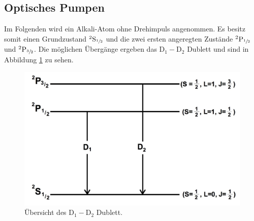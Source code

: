 \subsection{Optisches Pumpen}
Im Folgenden wird ein Alkali-Atom ohne Drehimpuls angenommen. Es besitz somit einen Grundzustand ${}^2\mathrm{S}_{\sfrac{1}{2}}$ und die zwei ersten angeregten Zustände ${}^2\mathrm{P}_{\sfrac{1}{2}}$ und ${}^2\mathrm{P}_{\sfrac{3}{2}}$. Die möglichen Übergänge ergeben das $\mathrm{D}_1-\mathrm{D}_2$ Dublett und sind in Abbildung \ref{fig:dublett} zu sehen.
\begin{figure}[h]
	\centering
	\includegraphics[width=0.8\linewidth]{img/dublett.jpg}
	\caption{Übersicht des $\mathrm{D}_1-\mathrm{D}_2$ Dublett.}
	\label{fig:dublett}
\end{figure}


